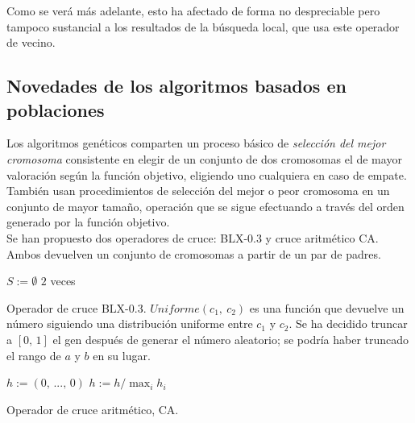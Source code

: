 \documentclass{article}
\newenvironment{algo}{
	\vspace*{0.5cm}
	\begin{algorithm}[H]}{
	\end{algorithm}
	\vspace*{0.5cm}
}
\begin{document}
Como se verá más adelante, esto ha afectado de forma no despreciable pero tampoco sustancial a los resultados de la búsqueda local, que usa este operador de vecino.

\subsection{Novedades de los algoritmos basados en poblaciones}

Los algoritmos genéticos comparten un proceso básico de \textit{selección del mejor cromosoma} consistente en elegir de un conjunto de dos cromosomas el de mayor valoración según la función objetivo, eligiendo uno cualquiera en caso de empate. También usan procedimientos de selección del mejor o peor cromosoma en un conjunto de mayor tamaño, operación que se sigue efectuando a través del orden generado por la función objetivo. \\

Se han propuesto dos operadores de cruce: BLX-0.3 y cruce aritmético CA. Ambos devuelven un conjunto de cromosomas a partir de un par de padres.

\begin{algo}
	
	$S := \emptyset$\;
	 $2$ veces\;
	
	\vspace{0.2cm}
	\caption{Operador de cruce BLX-0.3. $Uniforme(c_1,\ c_2)$ es una función que devuelve un número siguiendo una distribución uniforme entre $c_1$ y $c_2$. Se ha decidido truncar a $[0,\,1]$ el gen después de generar el número aleatorio; se podría haber truncado el rango de $a$ y $b$ en su lugar.}
\end{algo}

\vspace{-0.45cm}
\begin{algo}

	$h := (0,\,...,\,0)$\;
	$h := h / \max_i h_i$

	\vspace{0.2cm}
	\caption{Operador de cruce aritmético, CA.}
\end{algo}
\end{document}
